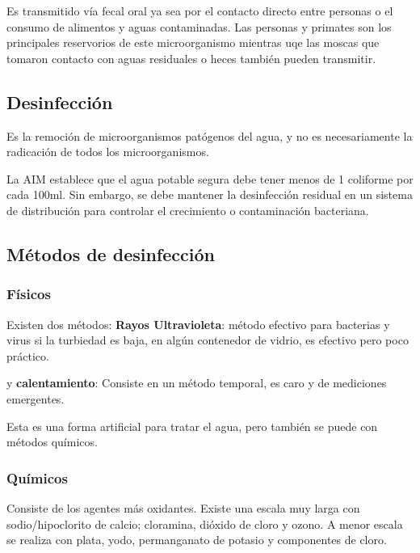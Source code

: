Es transmitido vía fecal oral ya sea por el contacto directo entre personas o el consumo de alimentos y aguas contaminadas. Las personas y primates son los principales reservorios de este microorganismo mientras uqe las moscas que tomaron contacto con aguas residuales o heces también pueden transmitir.

\subsection{Desinfección}
\begin{definition}[Desinfección]
    Es la remoción de microorganismos patógenos del agua, y no es necesariamente la radicación de todos los microorganismos.
\end{definition}
La AIM establece que el agua potable segura debe tener menos de 1 coliforme por cada 100ml.
Sin embargo, se debe mantener la desinfección residual en un sistema de distribución para controlar el crecimiento o contaminación bacteriana.
\subsection{Métodos de desinfección}
\subsubsection{Físicos}
Existen dos métodos: \textbf{Rayos Ultravioleta}: método efectivo para bacterias y virus si la turbiedad es baja, en algún contenedor de vidrio, es efectivo pero poco práctico.

y \textbf{calentamiento}: Consiste en un método temporal, es caro y de mediciones emergentes.

Esta es una forma artificial para tratar el agua, pero también se puede con métodos químicos.

\subsubsection{Químicos}
Consiste de los agentes más oxidantes. Existe una escala muy larga con sodio/hipoclorito de calcio; cloramina, dióxido de cloro y ozono. A menor escala se realiza con plata, yodo, permanganato de potasio y componentes de cloro. 

